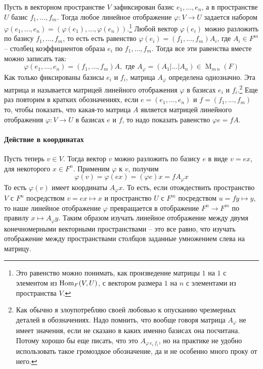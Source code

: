 Пусть в векторном пространстве $V$ зафиксирован базис $e_1,\ldots,e_n$, а в пространстве $U$ базис $f_1,\ldots, f_m$. Тогда любое линейное отображение $\varphi\colon V\to U$ задается набором $\varphi(e_1,\ldots,e_n) = (\varphi(e_1),\ldots, \varphi(e_n))$.\footnote{Это равенство можно понимать, как произведение матрицы $1$ на $1$ с элементом из $\operatorname{Hom}_F(V,U)$, с вектором размера $1$ на $n$ с элементами из пространства $V$.} Любой вектор $\varphi(e_i)$ можно разложить по базису $f_1,\ldots,f_m$, то есть есть равенство $\varphi(e_i) = (f_1,\ldots,f_m)A_i$, где $A_i\in F^m$ -- столбец коэффициентов образа $e_i$ по $f_1,\ldots,f_m$. Тогда все эти равенства вместе можно записать так:
\[
\varphi(e_1,\ldots,e_n) = (f_1,\ldots,f_m)A, \text{ где } A_\varphi = (A_1|\ldots|A_n)\in \operatorname{M}_{m\,n}(F)
\]
Как только фиксированы базисы $e_i$ и $f_i$, матрица $A_\varphi$ определена однозначно. Эта матрица и называется матрицей линейного отображения $\varphi$ в базисах $e_i$ и $f_i$.\footnote{Как обычно я злоупотребляю своей любовью к опусканию чрезмерных деталей в обозначениях. Надо помнить, что вообще говоря матрица $A_\varphi$ не имеет значения, если не сказано в каких именно базисах она посчитана. Потому хорошо бы еще писать, что это $A_{\varphi\,e_i\,f_i}$, но на практике не удобно использовать такое громоздкое обозначение, да и не особенно много проку от него.} Еще раз повторим в кратких обозначениях, если $e=(e_1,\ldots,e_n)$ и $f = (f_1,\ldots,f_m)$ то, чтобы показать, что какая-то матрица $A$ является матрицей линейного отображения $\varphi\colon V\to U$ в базисах $e$ и $f$, то надо показать равенство $\varphi e = f A$.

\paragraph{Действие в координатах}

Пусть теперь $v\in V$. Тогда вектор $v$ можно разложить по базису $e$ в виде $v = ex$, для некоторого $x\in F^n$. Применим $\varphi$ к $v$, получим
\[
\varphi(v) = \varphi(ex) = (\varphi e)x = f A_\varphi x
\]
То есть $\varphi(v)$ имеет координаты $A_\varphi x$. То есть, если отождествить пространство $V$ с $F^n$ посредством $v = ex \mapsto x$ и пространство $U$ с $F^m$ посредством $u = fy \mapsto y$, то наше линейное отображение $\varphi$ превращается в отображение $F^n \to F^m$ по правилу $x \mapsto A_\varphi y$. Таким образом изучать линейное отображение между двумя конечномерными векторными пространствами -- это все равно, что изучать отображение между пространствами столбцов заданные умножением слева на матрицу.



